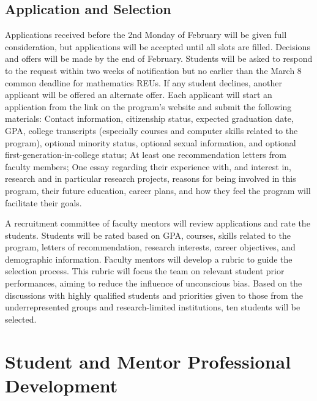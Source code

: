 \documentclass[11pt]{NSFamsart}
\begin{document}
\subsection{Application and Selection} 
Applications received before the 2nd Monday of February will be given full consideration, but applications will be accepted until all slots are filled. Decisions and offers will be made by the end of February. Students will be asked to respond to the request within two weeks of notification but no earlier than the March 8 common deadline for mathematics REUs. If any student declines, another applicant will be offered an alternate offer. 
Each applicant will start an application from the link on the program’s
website and submit the following materials: 
Contact information, citizenship status, expected graduation date, GPA, college transcripts (especially courses and computer skills related to the program),
optional minority status, optional sexual information, and optional first-generation-in-college status;
At least one recommendation
letters from faculty members; 
One essay regarding their experience with, and interest in, research and in particular research projects, reasons for being involved in this program, their future
education, career plans, and how they feel the program will facilitate their goals. 

A recruitment committee of faculty mentors will review applications and rate the students. Students
will be rated based on GPA, courses, skills related to the program, letters of recommendation,
research interests, career objectives, and demographic information. Faculty mentors
will develop a rubric to guide the selection
process. This rubric will focus the team on relevant student prior performances, aiming to reduce the
influence of unconscious bias. Based on the
discussions with highly qualified students and priorities given to those from the underrepresented
groups and research-limited institutions, ten students will be selected.


\section{Student and Mentor Professional Development}
\end{document}
